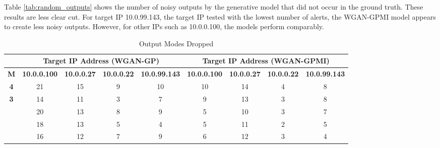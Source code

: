 Table \ref{tab:random_outputs} shows the number of noisy outputs by the generative model  that did not occur in the ground truth. These results are less clear cut. For target IP 10.0.99.143, the target IP tested with the lowest number of alerts, the WGAN-GPMI model appears to create less noisy outputs. However, for other IPs such as 10.0.0.100, the models perform comparably.


\begin{table}[!htbp]
	\centering
	\caption{Output Modes Dropped}
	\label{tab:output_modes}
	\begin{adjustbox}{angle=90}
		\begin{tabular}{ccccccccc}
			\multicolumn{1}{c|}{} & \multicolumn{4}{c|}{\textbf{Target IP Address (WGAN-GP)}} & \multicolumn{4}{c}{\textbf{Target IP Address (WGAN-GPMI)}} \\ \hline
			\multicolumn{1}{c|}{\textbf{M}} & \multicolumn{1}{l|}{\textbf{10.0.0.100}} & \multicolumn{1}{l|}{\textbf{10.0.0.27}} & \multicolumn{1}{l|}{\textbf{10.0.0.22}} & \multicolumn{1}{l|}{\textbf{10.0.99.143}} & \multicolumn{1}{l|}{\textbf{10.0.0.100}} & \multicolumn{1}{l|}{\textbf{10.0.0.27}} & \multicolumn{1}{l|}{\textbf{10.0.0.22}} & \multicolumn{1}{l}{\textbf{10.0.99.143}} \\ \hline
			\multicolumn{1}{c|}{\textbf{4}} & \multicolumn{1}{c|}{21} & \multicolumn{1}{c|}{15} & \multicolumn{1}{c|}{9} & \multicolumn{1}{c|}{10} & \multicolumn{1}{c|}{10} & \multicolumn{1}{c|}{14} & \multicolumn{1}{c|}{4} & 8 \\ \hline
			\multicolumn{1}{c|}{\multirow{4}{*}{\textbf{3}}} & \multicolumn{1}{c|}{14} & \multicolumn{1}{c|}{11} & \multicolumn{1}{c|}{3} & \multicolumn{1}{c|}{7} & \multicolumn{1}{c|}{9} & \multicolumn{1}{c|}{13} & \multicolumn{1}{c|}{3} & 8 \\
			\multicolumn{1}{c|}{} & \multicolumn{1}{c|}{20} & \multicolumn{1}{c|}{13} & \multicolumn{1}{c|}{8} & \multicolumn{1}{c|}{9} & \multicolumn{1}{c|}{5} & \multicolumn{1}{c|}{10} & \multicolumn{1}{c|}{3} & 7 \\
			\multicolumn{1}{c|}{} & \multicolumn{1}{c|}{18} & \multicolumn{1}{c|}{13} & \multicolumn{1}{c|}{5} & \multicolumn{1}{c|}{4} & \multicolumn{1}{c|}{5} & \multicolumn{1}{c|}{11} & \multicolumn{1}{c|}{2} & 5 \\
			\multicolumn{1}{c|}{} & \multicolumn{1}{c|}{16} & \multicolumn{1}{c|}{12} & \multicolumn{1}{c|}{7} & \multicolumn{1}{c|}{9} & \multicolumn{1}{c|}{6} & \multicolumn{1}{c|}{12} & \multicolumn{1}{c|}{3} & 4 \\ \hline

\end{tabular}
\end{adjustbox}
\end{table}
